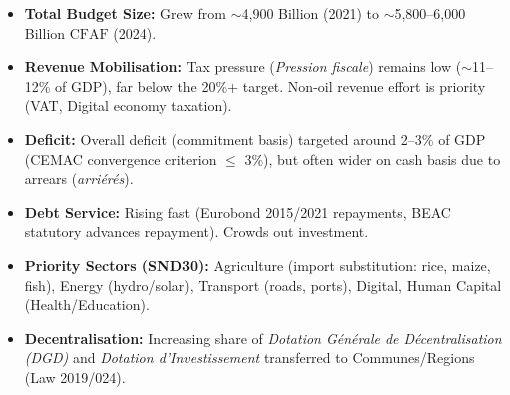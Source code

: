 \documentclass[11pt]{article}
\begin{document}
\begin{savaistu}
\begin{itemize}
    \item \textbf{Total Budget Size:} Grew from $\sim$4,900 Billion (2021) to $\sim$5,800–6,000 Billion $\mathrm{CFAF}$ (2024).
    \item \textbf{Revenue Mobilisation:} Tax pressure (\emph{Pression fiscale}) remains low ($\sim$11--12\% of GDP), far below the 20\%+ target. Non-oil revenue effort is priority (VAT, Digital economy taxation).
    \item \textbf{Deficit:} Overall deficit (commitment basis) targeted around 2--3\% of GDP (CEMAC convergence criterion $\le$ 3\%), but often wider on cash basis due to arrears (\emph{arriérés}).
    \item \textbf{Debt Service:} Rising fast (Eurobond 2015/2021 repayments, BEAC statutory advances repayment). Crowds out investment.
    \item \textbf{Priority Sectors (SND30):} Agriculture (import substitution: rice, maize, fish), Energy (hydro/solar), Transport (roads, ports), Digital, Human Capital (Health/Education).
    \item \textbf{Decentralisation:} Increasing share of \emph{Dotation Générale de Décentralisation (DGD)} and \emph{Dotation d'Investissement} transferred to Communes/Regions (Law 2019/024).
\end{itemize}
\end{savaistu}
\end{document}

